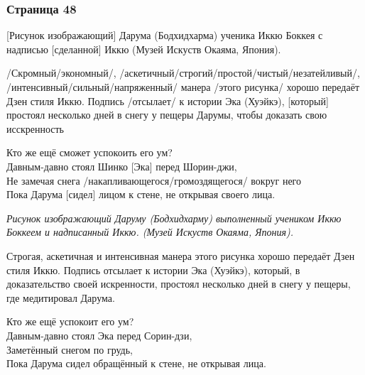 \subsubsection{Страница 48}
\begin{ver}{}
[Рисунок изображающий] Дарума (Бодхидхарма) ученика Иккю Боккея с
надписью [сделанной] Иккю (Музей Искуств Окаяма, Япония).
\end{ver}

\begin{ver}
/Скромный/экономный/,
/аскетичный/строгий/простой/чистый/незатейливый/,
/интенсивный/сильный/напряженный/ манера
/этого рисунка/ хорошо передаёт Дзен стиля Иккю. Подпись
/отсылает/ к истории Эка (Хуэйкэ), [который] простоял
несколько дней в снегу у пещеры Дарумы, чтобы доказать свою исскренность 
\end{ver}

\begin{ver}
  \begin{verses}
    Кто же ещё сможет успокоить его ум?\\
    Давным-давно стоял Шинко [Эка] перед Шорин-джи,\\
    Не замечая снега /накапливающегося/громоздящегося/ вокруг него\\
    Пока Дарума [сидел] лицом к стене, не открывая своего лица.
  \end{verses}
\end{ver}

\begin{ver}[1]\it
Рисунок изображающий Даруму (Бодхидхарму) выполненный учеником Иккю Боккеем
и надписанный Иккю. (Музей Искуств Окаяма, Япония).
\end{ver}

\begin{ver}[1]
Строгая, аскетичная и интенсивная манера этого рисунка хорошо
передаёт Дзен стиля Иккю. Подпись отсылает к истории Эка (Хуэйкэ),
который, в доказательство своей искренности, простоял несколько дней
в снегу у пещеры, где медитировал Дарума.
\end{ver}

\begin{ver}[1]
  \begin{verses}
    Кто же ещё успокоит его ум?\\
    Давным-давно стоял Эка перед Сорин-дзи,\\
    Заметённый снегом по грудь,\\
    Пока Дарума сидел обращённый к стене, не открывая  лица.
  \end{verses}
\end{ver}     

